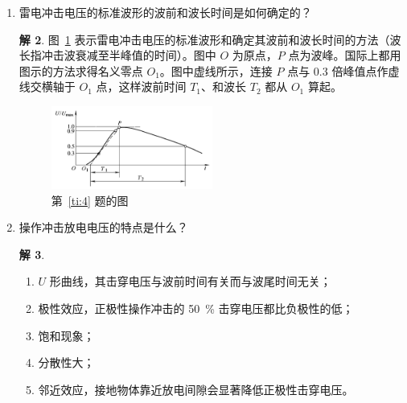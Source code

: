 \documentclass[zihao=-4,fontset = none]{ctexart}
\theoremstyle{definition}
\newtheorem*{solution}{解}
\begin{document}
\begin{enumerate}
\begin{solution}
\begin{enumerate}
      \item 当棒具有负极性时，阴极表面形成的电子立即进入强电场区，造成电子崩。当电子崩中的电子离开强电场区后，电子就不再能引起电离，而以越来越慢的速度向阳极运动。一部份电子直接消失于阳极，其余的可为氧原子所吸附形成负离子。电子崩中的正离子逐渐向棒极运动而消失于棒极，但由于其运动速度较慢，所以在棒极附近总是存在着正空间电荷。结果在棒极附近出现了比较集中的正空间电荷，而在其后则是非常分散的负空间电荷。负空间电荷由于浓度小，对外电场的影响不大，而正空间电荷将使电场畸变。棒极附近的电场得到增强，因而自持放电条件易于得到满足、易于转入流柱而形成电晕放电。
    \end{enumerate}
  \end{solution}
  \item \label{ti:4}雷电冲击电压的标准波形的波前和波长时间是如何确定的？
  \begin{solution}
    图~\ref{fig:4} 表示雷电冲击电压的标准波形和确定其波前和波长时间的方法（波长指冲击波衰减至半峰值的时间）。图中 $O$ 为原点，$P$ 点为波峰。国际上都用图示的方法求得名义零点 $O_1$。图中虚线所示，连接 $P$ 点与 $0.3$ 倍峰值点作虚线交横轴于 $O_1$ 点，这样波前时间 $T_1$、和波长 $T_2$ 都从 $O_1$ 算起。
    \begin{figure}[htbp]
      \centering
      \includegraphics[width=0.5\textwidth]{3.png}
      \caption{第~\ref{ti:4} 题的图}\label{fig:4}
    \end{figure}
  \end{solution}
  \item 操作冲击放电电压的特点是什么？
  \begin{solution}
    \begin{enumerate}
      \item $U$ 形曲线，其击穿电压与波前时间有关而与波尾时间无关；
      \item 极性效应，正极性操作冲击的 \SI{50}{\percent} 击穿电压都比负极性的低；
      \item 饱和现象；
      \item 分散性大；
      \item 邻近效应，接地物体靠近放电间隙会显著降低正极性击穿电压。
    \end{enumerate}
  \end{solution}

\end{enumerate}
\end{document}
